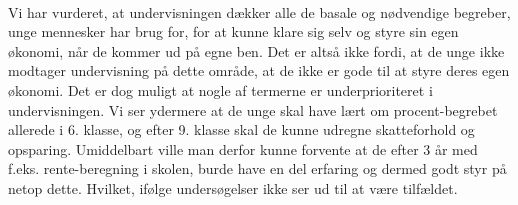 \\
Vi har vurderet, at undervisningen dækker alle de basale og nødvendige begreber, unge mennesker har brug for, for at kunne klare sig selv og styre sin egen økonomi, når de kommer ud på egne ben. Det er altså ikke fordi, at de unge ikke modtager undervisning på dette område, at de ikke er gode til at styre deres egen økonomi. Det er dog muligt at nogle af termerne er underprioriteret i undervisningen. Vi ser ydermere at de unge skal have lært om procent-begrebet allerede i 6. klasse, og efter 9. klasse skal de kunne udregne skatteforhold og opsparing. Umiddelbart ville man derfor kunne forvente at de efter 3 år med f.eks. rente-beregning i skolen, burde have en del erfaring og dermed godt styr på netop dette. Hvilket, ifølge undersøgelser ikke ser ud til at være tilfældet.
